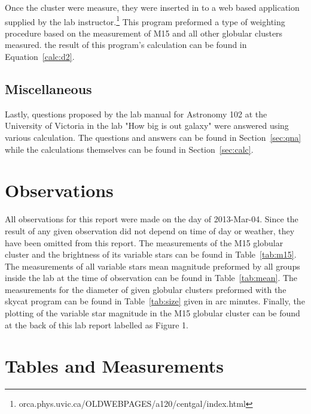 \documentclass{article}
\begin{document}
Once the cluster were measure, they were inserted in to a web based application supplied
by the lab instructor.\footnote{orca.phys.uvic.ca/OLDWEBPAGES/a120/centgal/index.html}
This program preformed a type of weighting procedure based on the measurement of M15
and all other globular clusters measured. the result of this program's calculation
can be found in Equation~\ref{calc:d2}.

\subsection{Miscellaneous}

Lastly, questions proposed by the lab manual for Astronomy 102 at the University of
Victoria in the lab "How big is out galaxy" were answered using various calculation.
The questions and answers can be found in Section~\ref{sec:qna} while the calculations
themselves can be found in Section~\ref{sec:calc}.


\section{Observations}

All observations for this report were made on the day of 2013-Mar-04. Since the result
of any given observation did not depend on time of day or weather, they have been omitted
from this report. The measurements of the M15 globular cluster and the brightness of its
variable stars can be found in Table~\ref{tab:m15}. The measurements of all variable stars
mean magnitude preformed by all groups inside the lab at the time of observation can 
be found in Table~\ref{tab:mean}. The measurements for the diameter of given globular
clusters preformed with the skycat program can be found in Table~\ref{tab:size} given
in arc minutes. Finally, the plotting of the variable star magnitude in the M15 globular
cluster can be found at the back of this lab report labelled as Figure 1.


\section{Tables and Measurements}
\end{document}

